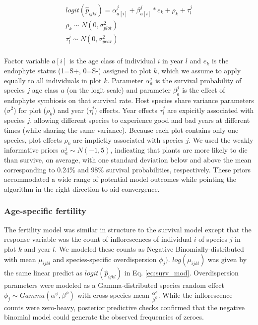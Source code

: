 \documentclass[11pt]{article}
\begin{document}
\begin{align*}
	logit(\hat{p}_{ijkl}) = \alpha^{j}_{a[i]} + \beta^{j}_{a[i]} * e_k + \rho_k + \tau^{j}_{l}\\
	\rho_k \sim N(0,\sigma^2_{plot})\\
	\tau^{j}_{l} \sim N(0,\sigma^2_{year})\\
	\label{eq:surv_mod}
\end{align*}

Factor variable $a[i]$ is the age class of individual $i$ in year $l$ and $e_k$ is the endophyte status (1=S+, 0=S-) assigned to plot $k$, which we assume to apply equally to all individuals in plot $k$. 
Parameter $\alpha^{j}_{a}$ is the survival probability of species $j$ age class $a$ (on the logit scale) and parameter $\beta^{j}_{a}$ is the effect of endophyte symbiosis on that survival rate. 
Host species share variance parameters ($\sigma^2$) for plot ($\rho_k$) and year ($\tau^{j}_{l}$) effects. 
Year effects $\tau^{j}_{l}$ are expicitly associated with species $j$, allowing different species to experience good and bad years at different times (while sharing the same variance).
Because each plot contains only one species, plot effects $\rho_k$ are implictly associated with species $j$.
We used the weakly informative priors $\alpha^{j}_{a} \sim N(-1,5)$, indicating that plants are more likely to die than survive, on average, with one standard deviation below and above the mean corresponding to $0.24\%$ and $98\%$ survival probabilities, respectively.
These priors accommodated a wide range of potential model outcomes while pointing the algorithm in the right direction to aid convergence. 

\subsubsection*{Age-specific fertility}
The fertility model was similar in structure to the survival model except that the response variable was the count of inflorescences of individual $i$ of species $j$ in plot $k$ and year $l$. 
We modeled these counts as Negative Binomially-distributed with mean $\mu_{ijkl}$ and species-specific overdispersion $\phi_{j})$. 
$log(\mu_{ijkl})$ was given by the same linear predict as $logit(\hat{p}_{ijkl})$ in Eq. \ref{eq:surv_mod}. 
Overdispersion parameters were modeled as a Gamma-distributed species random effect $\phi_{j} \sim Gamma(\alpha^\phi,\beta^\phi)$ with cross-species mean $\frac{\alpha^\phi}{\beta^\phi}$. 
While the inflorescence counts were zero-heavy, posterior predictive checks confirmed that the negative binomial model could generate the observed frequencies of zeroes. 
\end{document}
